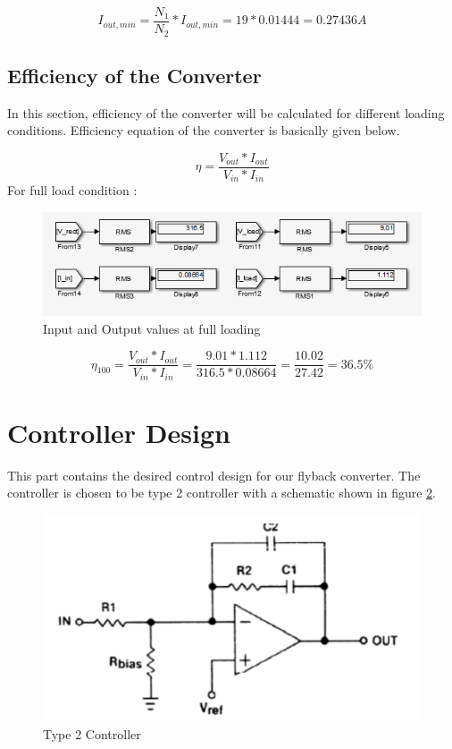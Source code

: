 \documentclass[12pt]{article}
\begin{document}
\begin{equation*}
    I_{out,min}= \dfrac{N_{1}}{N_{2}}*I_{out,min}= 19*0.01444 = 0.27436 A
\end{equation*}
       
\subsection{Efficiency of the Converter}

In this section, efficiency of the converter will be calculated for different loading conditions. Efficiency equation of the converter is basically given below. 

\begin{equation*}
    \eta = \dfrac{V_{out}*I_{out}}{V_{in}*I_{in}}
\end{equation*}      
For full load condition :
       


\begin{figure}[H]
    \centering
    \includegraphics[width=15 cm]{effic100}
    \caption{Input and Output values at full loading}
    \label{fig:100}
\end{figure}

\begin{equation*}
    \eta_{100} = \dfrac{V_{out}*I_{out}}{V_{in}*I_{in}}=\dfrac{9.01*1.112}{316.5*0.08664}= \dfrac{10.02}{27.42}= 36.5 \%
\end{equation*} 


       
\section{Controller Design}

This part contains the desired control design for our flyback converter. The controller is chosen to be type 2 controller with a schematic shown in figure \ref{fig:controller}.
\begin{figure}[H]
    \centering
    \includegraphics[width=15 cm]{controller}
    \caption{Type 2 Controller}
    \label{fig:controller}
\end{figure}
\end{document}
